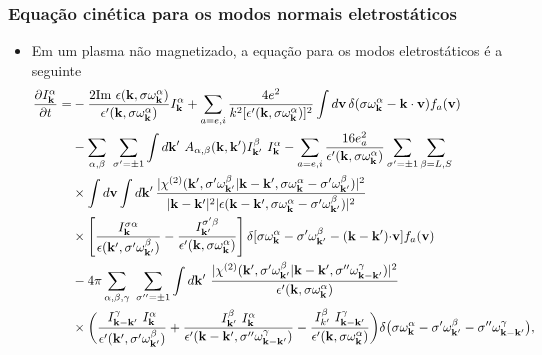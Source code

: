 \documentclass[10pt,aspectratio=1610,lualatex]{beamer}
\begin{document}
\begin{frame}
  \frametitle{Equação cinética para os modos normais eletrostáticos}
  \begin{itemize}
    \item Em um plasma não magnetizado, a equação para os modos
    eletrostáticos é a seguinte
    \begin{equation*}
      \begin{split}
	\frac{\partial I^{\alpha}_{\bf k}}{\partial t}
	=&-\frac{2 \mbox{Im}\ \epsilon({\bf k},\sigma\omega_{\bf k}^{\alpha})}
	{\epsilon '({\bf k},\sigma \omega_{\bf k}^{\alpha})}I^{\alpha}_{\bf k}
	+\sum_{a=e,i}
	\frac{4e^2}{k^2[\epsilon '({\bf k},\sigma\omega_{\bf k}^\alpha)]^2}
	\int d{\bf v}\,
	\delta(\sigma\omega_{\bf k}^\alpha-{\bf k \cdot v})f_a({\bf v})\\
	&-\sum_{\alpha,\beta}\ \sum_{\sigma '=\pm 1} \int d{\bf k '}\
	A_{\alpha,\beta}({\bf k,k'}) I_{\bf k'}^{\beta}\ I_{\bf k}^{\alpha}
	-\sum_{a=e,i}\frac{16 e_a^2}{\epsilon '({\bf k},\sigma\omega_{\bf k}^\alpha)}
	\sum_{\sigma '=\pm 1}\sum_{\beta=L,S}\\
	&\times\int d{\bf v}\int d{\bf k '}\,
	\frac{|\chi^{(2)}({\bf k'},\sigma '\omega_{\bf k'}^{\beta}|
	  {\bf k-k'}, \sigma \omega_{\bf k}^\alpha-\sigma '
	  \omega_{\bf k'}^{\beta})|^2}{|{\bf k-k'}|^2|
	  \epsilon({\bf k-k'},\sigma \omega_{\bf k}^\alpha
	  -\sigma '\omega_{\bf k'}^{\beta})|^2}\\
	&\times\left[ \frac{I_{\bf k}^{\sigma \alpha}}
	  {\epsilon({\bf k '},\sigma '\omega_{\bf k'}^\beta)}
	  -\frac{I_{\bf k'}^{\sigma '\beta}}
	  {\epsilon '({\bf k },\sigma \omega_{\bf k}^\alpha)}\right]
	\delta[\sigma \omega_{\bf k}^\alpha-\sigma '\omega_{\bf k'}^\beta
	-({\bf k-k'}){\bf \cdot v}] f_a({\bf v})\\
	&-4\pi \sum_{\alpha,\beta,\gamma}\ \sum_{\sigma ''= \pm 1}\int d{\bf k '}\
	\frac{|\chi^{(2)}({\bf k'},\sigma '\omega_{\bf k'}^\beta|
	  {\bf k-k'}, \sigma ''\omega_{\bf k-k'}^\gamma)|^2}
	{\epsilon '({\bf k},\sigma \omega_{\bf k}^{\alpha})}\\
	&\times \biggl(\frac{I_{\bf k-k'}^{\gamma}\ I_{\bf k}^{\alpha}}
	{\epsilon '({\bf k'},\sigma ' \omega_{\bf k'}^{\beta})}
	+\frac{I_{\bf k'}^{\beta}\ I_{\bf k}^{\alpha}}
	{\epsilon '({\bf k-k'},\sigma ''\omega_{\bf k-k'}^{\gamma})}
	-\frac{I_{k'}^{\beta}\ I_{\bf k-k'}^{\gamma}}
	{\epsilon '({\bf k},\sigma \omega_{\bf k}^{\alpha})}\biggr)
	\delta\bigl(\sigma \omega_{\bf k}^{\alpha}-\sigma '
	\omega_{\bf k'}^{\beta} -\sigma '' \omega_{\bf k-k'}^{\gamma}\bigr),
	\label{wave-lin}
      \end{split}
    \end{equation*}
  \end{itemize}
\end{frame}
\end{document}
